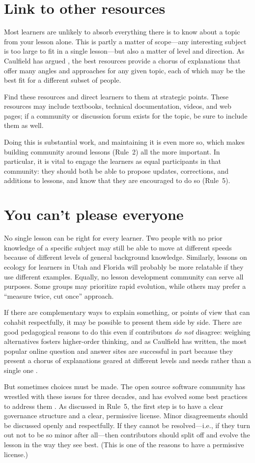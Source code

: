 \documentclass[10pt,letterpaper]{article}
\newcommand{\rulemajor}[1]{\section{#1}}
\begin{document}
\rulemajor{Link to other resources}

Most learners are unlikely to absorb everything there is to know about a topic
from your lesson alone.
This is partly a matter of scope---any interesting subject is too large
to fit in a single lesson---but also a matter of level and direction.
As Caulfield has argued \cite{choral-explanations},
the best resources provide a chorus of explanations
that offer many angles and approaches for any given topic,
each of which may be the best fit for a different subset of people.

Find these resources and direct learners to them at strategic points.
These resources may include textbooks,
technical documentation,
videos,
and web pages;
if a community or discussion forum exists for the topic,
be sure to include them as well.

Doing this is substantial work,
and maintaining it is even more so,
which makes building community around lessons (Rule~2) all the more important.
In particular,
it is vital to engage the learners as equal participants in that community:
they should both be able to propose updates, corrections, and additions to lessons,
and know that they are encouraged to do so (Rule~5).

\rulemajor{You can't please everyone}

No single lesson can be right for every learner.
Two people with no prior knowledge of a specific subject
may still be able to move at different speeds
because of different levels of general background knowledge.
Similarly,
lessons on ecology for learners in Utah and Florida
will probably be more relatable if they use different examples.
Equally,
no lesson development community can serve all purposes.
Some groups may prioritize rapid evolution,
while others may prefer a ``measure twice, cut once'' approach.

If there are complementary ways to explain something,
or points of view that can cohabit respectfully,
it may be possible to present them side by side.
There are good pedagogical reasons to do this
even if contributors \emph{do not} disagree:
weighing alternatives fosters higher-order thinking,
and as Caulfield has written,
the most popular online question and answer sites
are successful in part because they present a chorus of explanations
geared at different levels and needs
rather than a single one \cite{choral-explanations}.

But sometimes choices must be made.
The open source software community has wrestled with these issues for three decades,
and has evolved some best practices to address them
\cite{producing-oss}.
As discussed in Rule~5,
the first step is to have a clear governance structure and a clear, permissive license.
Minor disagreements should be discussed openly and respectfully.
If they cannot be resolved---i.e., if they turn out not to be so minor after all---then
contributors should split off and evolve the lesson in the way they see best.
(This is one of the reasons to have a permissive license.)
\end{document}
